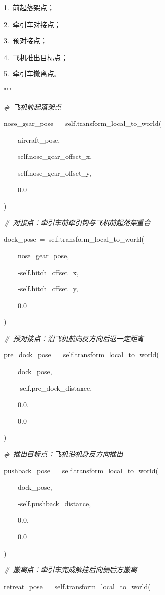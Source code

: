 ~~~~~~~~1.~前起落架点；

~~~~~~~~2.~牵引车对接点；

~~~~~~~~3.~预对接点；

~~~~~~~~4.~飞机推出目标点；

~~~~~~~~5.~牵引车撤离点。

~~~~~~~~"""

~~~~~~~~\emph{\#~飞机前起落架点}

~~~~~~~~nose\_gear\_pose~=~self.transform\_local\_to\_world(

~~~~~~~~~~~~aircraft\_pose,

~~~~~~~~~~~~self.nose\_gear\_offset\_x,

~~~~~~~~~~~~self.nose\_gear\_offset\_y,

~~~~~~~~~~~~0.0

~~~~~~~~)

~~~~~~~~\emph{\#~对接点：牵引车前牵引钩与飞机前起落架重合}

~~~~~~~~dock\_pose~=~self.transform\_local\_to\_world(

~~~~~~~~~~~~nose\_gear\_pose,

~~~~~~~~~~~~-self.hitch\_offset\_x,

~~~~~~~~~~~~-self.hitch\_offset\_y,

~~~~~~~~~~~~0.0

~~~~~~~~)

~~~~~~~~\emph{\#~预对接点：沿飞机航向反方向后退一定距离}

~~~~~~~~pre\_dock\_pose~=~self.transform\_local\_to\_world(

~~~~~~~~~~~~dock\_pose,

~~~~~~~~~~~~-self.pre\_dock\_distance,

~~~~~~~~~~~~0.0,

~~~~~~~~~~~~0.0

~~~~~~~~)

~~~~~~~~\emph{\#~推出目标点：飞机沿机身反方向推出}

~~~~~~~~pushback\_pose~=~self.transform\_local\_to\_world(

~~~~~~~~~~~~dock\_pose,

~~~~~~~~~~~~-self.pushback\_distance,

~~~~~~~~~~~~0.0,

~~~~~~~~~~~~0.0

~~~~~~~~)

~~~~~~~~\emph{\#~撤离点：牵引车完成解挂后向侧后方撤离}

~~~~~~~~retreat\_pose~=~self.transform\_local\_to\_world(

